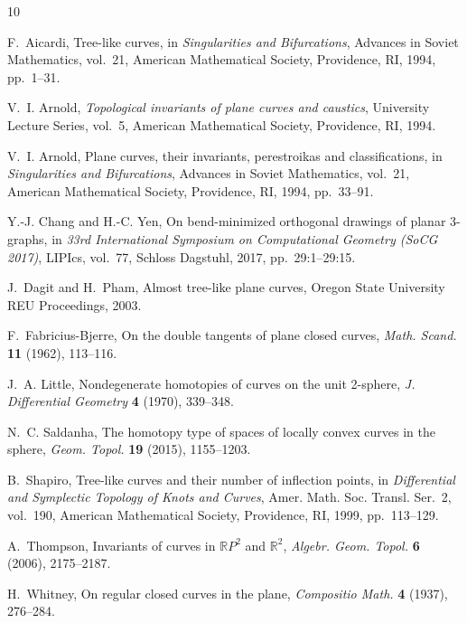 \documentclass[11pt]{article}
\begin{document}
\begin{thebibliography}{10}

F.~Aicardi,
Tree-like curves,
in \emph{Singularities and Bifurcations},
Advances in Soviet Mathematics, vol.~21,
American Mathematical Society, Providence, RI, 1994, pp.~1--31.

V.~I. Arnold,
\emph{Topological invariants of plane curves and caustics},
University Lecture Series, vol.~5,
American Mathematical Society, Providence, RI, 1994.

V.~I. Arnold,
Plane curves, their invariants, perestroikas and classifications,
in \emph{Singularities and Bifurcations},
Advances in Soviet Mathematics, vol.~21,
American Mathematical Society, Providence, RI, 1994, pp.~33--91.

Y.-J. Chang and H.-C. Yen,
On bend-minimized orthogonal drawings of planar 3-graphs,
in \emph{33rd International Symposium on Computational Geometry (SoCG 2017)},
LIPIcs, vol.~77, Schloss Dagstuhl, 2017, pp.~29:1--29:15.

J.~Dagit and H.~Pham,
Almost tree-like plane curves,
Oregon State University REU Proceedings, 2003.

F.~Fabricius-Bjerre,
On the double tangents of plane closed curves,
\emph{Math. Scand.} \textbf{11} (1962), 113--116.

J.~A. Little,
Nondegenerate homotopies of curves on the unit 2-sphere,
\emph{J. Differential Geometry} \textbf{4} (1970), 339--348.

N.~C. Saldanha,
The homotopy type of spaces of locally convex curves in the sphere,
\emph{Geom. Topol.} \textbf{19} (2015), 1155--1203.

B.~Shapiro,
Tree-like curves and their number of inflection points,
in \emph{Differential and Symplectic Topology of Knots and Curves},
Amer. Math. Soc. Transl. Ser.~2, vol.~190,
American Mathematical Society, Providence, RI, 1999, pp.~113--129.

A.~Thompson,
Invariants of curves in $\mathbb RP^2$ and $\mathbb R^2$,
\emph{Algebr. Geom. Topol.} \textbf{6} (2006), 2175--2187.

H.~Whitney,
On regular closed curves in the plane,
\emph{Compositio Math.} \textbf{4} (1937), 276--284.

\end{thebibliography}
\end{document}
